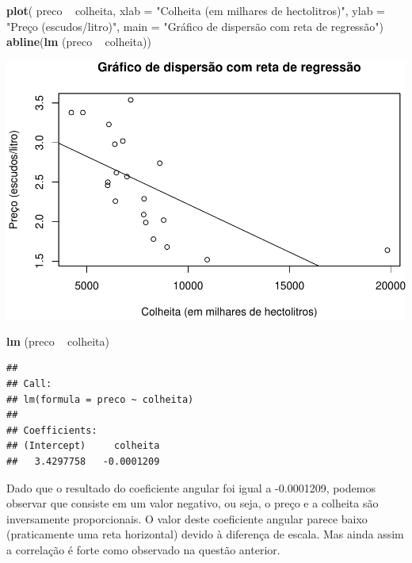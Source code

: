 \documentclass[11pt,]{article}
\makeatletter
\newenvironment{Shaded}{\begin{snugshade}}{\end{snugshade}}
\newcommand{\KeywordTok}[1]{\textcolor[rgb]{0.13,0.29,0.53}{\textbf{{#1}}}}
\newcommand{\DataTypeTok}[1]{\textcolor[rgb]{0.13,0.29,0.53}{{#1}}}
\newcommand{\StringTok}[1]{\textcolor[rgb]{0.31,0.60,0.02}{{#1}}}
\newcommand{\NormalTok}[1]{{#1}}
\def\maxwidth{\ifdim\Gin@nat@width>\linewidth\linewidth
\else\Gin@nat@width\fi}
\let\Oldincludegraphics\includegraphics
\renewcommand{\includegraphics}[1]{\Oldincludegraphics[width=\maxwidth]{#1}}
\makeatother
\begin{document}
\begin{Shaded}
\begin{Highlighting}[]
\KeywordTok{plot}\NormalTok{( preco ~}\StringTok{ }\NormalTok{colheita, }
      \DataTypeTok{xlab =} \StringTok{"Colheita (em milhares de hectolitros)"}\NormalTok{,}
      \DataTypeTok{ylab =} \StringTok{"Preço (escudos/litro)"}\NormalTok{,}
      \DataTypeTok{main =} \StringTok{"Gráfico de dispersão com reta de regressão"}\NormalTok{)}
\KeywordTok{abline}\NormalTok{(}\KeywordTok{lm} \NormalTok{(preco ~}\StringTok{ }\NormalTok{colheita))}
\end{Highlighting}
\end{Shaded}

\includegraphics{versaofinal_lista3_files/figure-latex/unnamed-chunk-3-1.pdf}

\begin{Shaded}
\begin{Highlighting}[]
\KeywordTok{lm} \NormalTok{(preco ~}\StringTok{ }\NormalTok{colheita)}
\end{Highlighting}
\end{Shaded}

\begin{verbatim}
## 
## Call:
## lm(formula = preco ~ colheita)
## 
## Coefficients:
## (Intercept)     colheita  
##   3.4297758   -0.0001209
\end{verbatim}

Dado que o resultado do coeficiente angular foi igual a -0.0001209,
podemos observar que consiste em um valor negativo, ou seja, o preço e a
colheita são inversamente proporcionais. O valor deste coeficiente
angular parece baixo (praticamente uma reta horizontal) devido à
diferença de escala. Mas ainda assim a correlação é forte como observado
na questão anterior.
\end{document}
